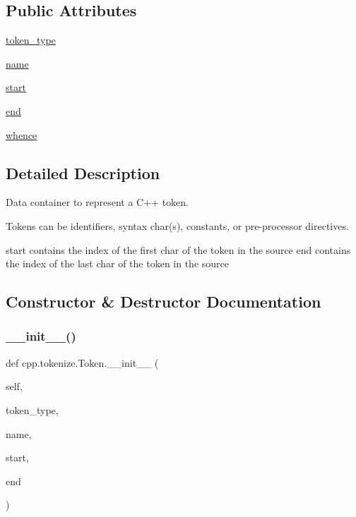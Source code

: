 \subsection*{Public Attributes}
\begin{DoxyCompactItemize}
\item 
\hyperlink{classcpp_1_1tokenize_1_1_token_a60c6e5120f3947885f10788ceb69a660}{token\+\_\+type}
\item 
\hyperlink{classcpp_1_1tokenize_1_1_token_a90859dd16bde71bc38f717f5119e63b9}{name}
\item 
\hyperlink{classcpp_1_1tokenize_1_1_token_a8ec48e348ff29901857cb21553da464b}{start}
\item 
\hyperlink{classcpp_1_1tokenize_1_1_token_a9935738c382352eca19834c2533715db}{end}
\item 
\hyperlink{classcpp_1_1tokenize_1_1_token_a9d3a8011707ede6be85987d74f88848d}{whence}
\end{DoxyCompactItemize}


\subsection{Detailed Description}
\begin{DoxyVerb}Data container to represent a C++ token.

Tokens can be identifiers, syntax char(s), constants, or
pre-processor directives.

start contains the index of the first char of the token in the source
end contains the index of the last char of the token in the source
\end{DoxyVerb}
 

\subsection{Constructor \& Destructor Documentation}
\mbox{\label{classcpp_1_1tokenize_1_1_token_a7da7659a5a6c61d0f4b8590cf96e19fd}} 
\subsubsection{\texorpdfstring{\+\_\+\+\_\+init\+\_\+\+\_\+()}{\_\_init\_\_()}}
{\footnotesize\ttfamily def cpp.\+tokenize.\+Token.\+\_\+\+\_\+init\+\_\+\+\_\+ (\begin{DoxyParamCaption}\item[{}]{self,  }\item[{}]{token\+\_\+type,  }\item[{}]{name,  }\item[{}]{start,  }\item[{}]{end }\end{DoxyParamCaption})}



